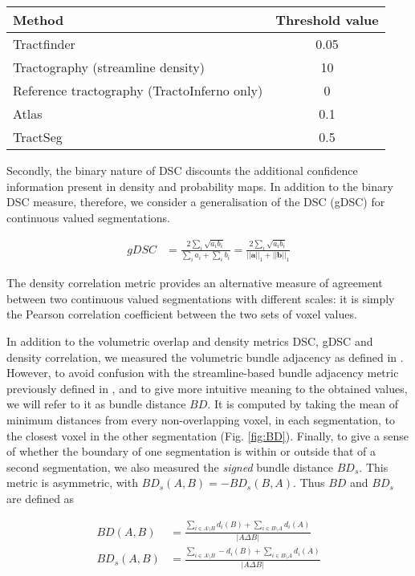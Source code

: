 \begin{tabularx}{0.5\textwidth}{X c}
  Method    & Threshold value \\
  \hline
  Tractfinder   & 0.05 \\
  Tractography (streamline density)  & 10 \\
  Reference tractography (TractoInferno only) & 0 \\
  Atlas         & 0.1 \\
  TractSeg      & 0.5 \\
  \hline
\end{tabularx}

Secondly, the binary nature of DSC discounts the additional confidence information present in density and probability maps.
In addition to the binary DSC measure, therefore, we consider a generalisation of the DSC (gDSC) for continuous valued segmentations.

\begin{align}
  gDSC &= \frac{2 \sum_i \sqrt{a_ib_i} }{\sum_ia_i + \sum_ib_i}
   =  \frac{2 \sum_i \sqrt{a_ib_i} }{||\mathbf{a}||_1 + ||\mathbf{b}||_1}
\end{align}

The density correlation metric provides an alternative measure of agreement between two continuous valued segmentations with different scales:
it is simply the Pearson correlation coefficient between the two sets of voxel values.

In addition to the volumetric overlap and density metrics DSC, gDSC and density correlation, we measured the volumetric bundle adjacency as defined in \textcite{Schilling2021a}.
However, to avoid confusion with the streamline-based bundle adjacency\autocite{Radwan2022, Garyfallidis2012, Rheault2022} metric previously defined in \textcite{Garyfallidis2012},
and to give more intuitive meaning to the obtained values, we will refer to it as bundle distance $BD$.
It is computed by taking the mean of minimum distances from every non-overlapping voxel, in each segmentation, to the closest voxel in the other segmentation (Fig. \ref{fig:BD}).
Finally, to give a sense of whether the boundary of one segmentation is within or outside that of a second segmentation, we also measured the \textit{signed} bundle distance $BD_s$.
This metric is asymmetric, with $BD_s (A,B) = -BD_s(B,A)$.
Thus $BD$ and $BD_s$ are defined as

\begin{align}
  BD(A,B) &= \frac{\sum_{i \in A\setminus B} d_i(B) + \sum_{i \in B\setminus A} d_i(A)}{|A\Delta B|} \label{eq:bd} \\
  BD_s(A,B) &= \frac{\sum_{i \in A\setminus B} - d_i(B) + \sum_{i \in B\setminus A} d_i(A)}{|A\Delta B|} \label{eq:bds}
\end{align}

